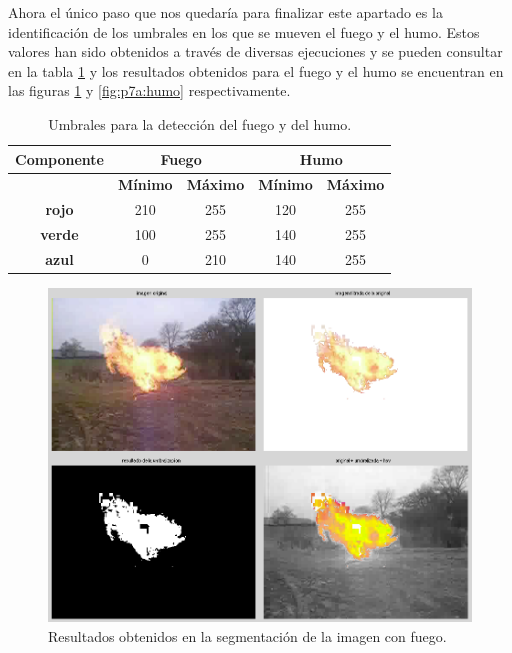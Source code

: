 \documentclass{article}
\begin{document}
	Ahora el único paso que nos quedaría para finalizar este apartado es la identificación de los umbrales en los que se mueven el fuego y el humo. Estos valores han sido obtenidos a través de diversas ejecuciones y se pueden consultar en la tabla \ref{tab:p7a:umbrales} y los resultados obtenidos para el fuego y el humo se encuentran en las figuras \ref{fig:p7a:fuego} y \ref{fig:p7a:humo} respectivamente.

\begin{table}
	\begin{center}
		\begin{tabular}{|c|c|c|c|c|}
\hline
\textbf{Componente} & \multicolumn{2}{c|}{\textbf{Fuego}}  & \multicolumn{2}{c|}{\textbf{Humo}}\\ \hline
 & \textbf{Mínimo} & \textbf{Máximo} & \textbf{Mínimo} & \textbf{Máximo} \\ \hline
\textbf{rojo}  & 210 & 255 & 120 & 255 \\ \hline
\textbf{verde} & 100 & 255 & 140 & 255 \\ \hline
\textbf{azul}  &   0 & 210 & 140 & 255 \\ \hline
		\end{tabular}
		\caption{Umbrales para la detección del fuego y del humo.}
		\label{tab:p7a:umbrales}
	\end{center}
\end{table}

\begin{figure}[h]
  \centering
    \includegraphics[width=1\textwidth]{img/p7a_fuego.png}
  \caption{Resultados obtenidos en la segmentación de la imagen con fuego.}
  \label{fig:p7a:fuego}
\end{figure}
\end{document}
